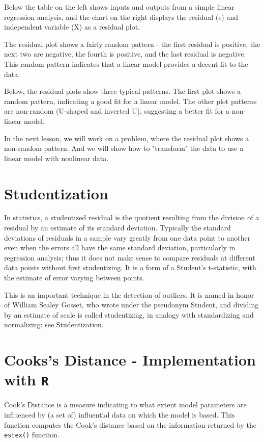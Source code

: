 \documentclass[12pt, a4paper]{report}
\theoremstyle{plain}
\theoremstyle{definition}
\theoremstyle{remark}
\begin{document}
	Below the table on the left shows inputs and outputs from a simple linear regression analysis, and the chart on the right displays the residual (e) and independent variable (X) as a residual plot.
	
	\newpage
	The residual plot shows a fairly random pattern - the first residual is positive, the next two are negative, the fourth is positive, and the last residual is negative. This random pattern indicates that a linear model provides a decent fit to the data.
	
	Below, the residual plots show three typical patterns. The first plot shows a random pattern, indicating a good fit for a linear model. The other plot patterns are non-random (U-shaped and inverted U), suggesting a better fit for a non-linear model.
	
	
	In the next lesson, we will work on a problem, where the residual plot shows a non-random pattern. And we will show how to "transform" the data to use a linear model with nonlinear data.
	
	\section{Studentization}
	In statistics, a studentized residual is the quotient resulting from the division of a residual by an estimate of its standard deviation. Typically the standard deviations of residuals in a sample vary greatly from one data point to another even when the errors all have the same standard deviation, particularly in regression analysis; thus it does not make sense to compare residuals at different data points without first studentizing. It is a form of a Student's t-statistic, with the estimate of error varying between points.
	
	This is an important technique in the detection of outliers. It is named in honor of William Sealey Gosset, who wrote under the pseudonym Student, and dividing by an estimate of scale is called studentizing, in analogy with standardizing and normalizing: see Studentization.
	
	
	
	\section{Cooks's Distance - Implementation with \texttt{R}}
	Cook's Distance is a measure indicating to what extent model parameters are influenced by (a set of) influential data on which the model is based. This function computes the Cook's distance based on the information returned by the \texttt{estex()} function.
	
\end{document}
